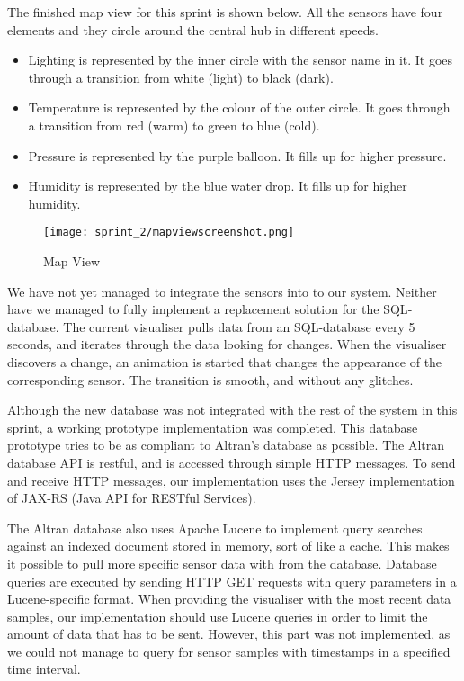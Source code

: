 \documentclass[../document]{subfiles}
\begin{document}
The finished map view for this sprint is shown below. All the sensors have four elements and they circle around the central hub in different speeds.

\begin{itemize}
\item
Lighting is represented by the inner circle with the sensor name in it. It goes through a transition from white (light) to black (dark).
\item
Temperature is represented by the colour of the outer circle. It goes through a transition from red (warm) to green to blue (cold).
\item
Pressure is represented by the purple balloon. It fills up for higher pressure.
\item
Humidity is represented by the blue water drop. It fills up for higher humidity.
\end{itemize}

\begin{figure}[H]
	\centering
	\texttt{[image: sprint\_2/mapviewscreenshot.png]}
	\caption{Map View}
\end{figure}

We have not yet managed to integrate the sensors into to our system. Neither have we managed to fully implement a replacement solution for the \gls{SQL}-database. The current visualiser pulls data from an \gls{SQL}-database every 5 seconds, and iterates through the data looking for changes. When the visualiser discovers a change, an animation is started that changes the appearance of the corresponding sensor. The transition is smooth, and without any glitches.

Although the new database was not integrated with the rest of the system in this sprint, a working prototype implementation was completed. This database prototype tries to be as compliant to Altran’s database as possible. The \gls{Altran} database \gls{API} is restful, and is accessed through simple \gls{HTTP} messages. To send and receive \gls{HTTP} messages, our implementation uses the Jersey implementation of JAX-RS (\gls{Java} \gls{API} for RESTful Services).

The \gls{Altran} database also uses Apache Lucene to implement query searches against an indexed document stored in memory, sort of like a cache. This makes it possible to pull more specific sensor data with from the database. Database queries are executed by sending \gls{HTTP} GET requests with query parameters in a Lucene-specific format. When providing the visualiser with the most recent data samples, our implementation should use Lucene queries in order to limit the amount of data that has to be sent. However, this part was not implemented, as we could not manage to query for sensor samples with timestamps in a specified time interval.
\end{document}
